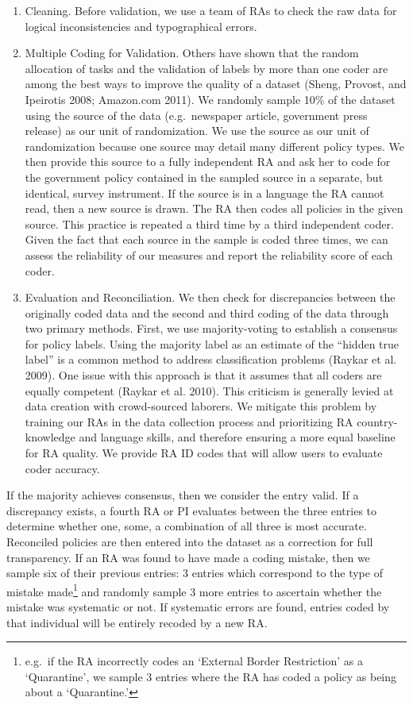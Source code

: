 \documentclass[]{article}
\let\rmarkdownfootnote\footnote%
\def\footnote{\protect\rmarkdownfootnote}
\begin{document}
\begin{enumerate}
\def\labelenumi{\arabic{enumi}.}
\item
  Cleaning. Before validation, we use a team of RAs to check the raw data for logical inconsistencies and typographical errors.
\item
  Multiple Coding for Validation. Others have shown that the random allocation of tasks and the validation of labels by more than one coder are among the best ways to improve the quality of a dataset (Sheng, Provost, and Ipeirotis 2008; Amazon.com 2011). We randomly sample 10\% of the dataset using the source of the data (e.g.~newspaper article, government press release) as our unit of randomization. We use the source as our unit of randomization because one source may detail many different policy types. We then provide this source to a fully independent RA and ask her to code for the government policy contained in the sampled source in a separate, but identical, survey instrument. If the source is in a language the RA cannot read, then a new source is drawn. The RA then codes all policies in the given source. This practice is repeated a third time by a third independent coder. Given the fact that each source in the sample is coded three times, we can assess the reliability of our measures and report the reliability score of each coder.
\item
  Evaluation and Reconciliation. We then check for discrepancies between the originally coded data and the second and third coding of the data through two primary methods. First, we use majority-voting to establish a consensus for policy labels. Using the majority label as an estimate of the ``hidden true label'' is a common method to address classification problems (Raykar et al. 2009). One issue with this approach is that it assumes that all coders are equally competent (Raykar et al. 2010). This criticism is generally levied at data creation with crowd-sourced laborers. We mitigate this problem by training our RAs in the data collection process and prioritizing RA country-knowledge and language skills, and therefore ensuring a more equal baseline for RA quality. We provide RA ID codes that will allow users to evaluate coder accuracy.
\end{enumerate}

If the majority achieves consensus, then we consider the entry valid. If a discrepancy exists, a fourth RA or PI evaluates between the three entries to determine whether one, some, a combination of all three is most accurate. Reconciled policies are then entered into the dataset as a correction for full transparency. If an RA was found to have made a coding mistake, then we sample six of their previous entries: 3 entries which correspond to the type of mistake made\footnote{e.g.~if the RA incorrectly codes an `External Border Restriction' as a `Quarantine', we sample 3 entries where the RA has coded a policy as being about a `Quarantine.'} and randomly sample 3 more entries to ascertain whether the mistake was systematic or not. If systematic errors are found, entries coded by that individual will be entirely recoded by a new RA.
\end{document}
